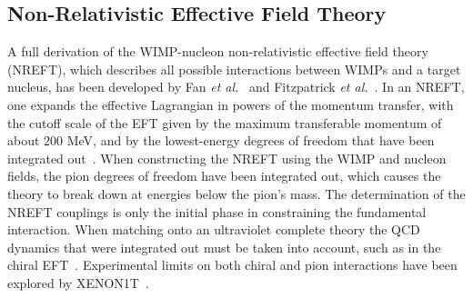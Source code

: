 \documentclass[reprint, showpacs,
preprintnumbers,
amsmath,amssymb,
aps, floatfix,
superscriptaddress,
prd, nofootinbib]{revtex4-1}
\begin{document}
\subsection{\label{subsec:theory}Non-Relativistic Effective Field Theory} 
A full derivation of the WIMP-nucleon non-relativistic effective field theory (NREFT), which describes all possible interactions between WIMPs and a target nucleus, has been developed by Fan \textit{et al.}~\cite{Fan_2010} and Fitzpatrick \textit{et al.}~\cite{Fitzpatrick:EFT}.
In an NREFT, one expands the effective Lagrangian in powers of the momentum transfer, with the cutoff scale of the EFT given by the maximum transferable momentum of about 200 MeV, and by the lowest-energy degrees of freedom that have been integrated out~\cite{Fitzpatrick:EFT}.
When constructing the NREFT using the WIMP and nucleon fields, the pion degrees of freedom have been integrated out, which causes the theory to break down at energies below the pion's mass.
The determination of the NREFT couplings is only the initial phase in constraining the fundamental interaction.
When matching onto an ultraviolet complete theory the QCD dynamics that were integrated out must be taken into account, such as in the chiral EFT~\cite{Bishara_2017,Hoferichter_2018}.
Experimental limits on both chiral and pion interactions have been explored by XENON1T~\cite{Xenon1t:wimp-pion-eft-2019,Xenon1t:eft_2022}.
\end{document}
